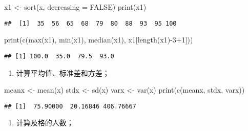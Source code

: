 \documentclass[
]{article}
\newenvironment{Shaded}{\begin{snugshade}}{\end{snugshade}}
\newcommand{\AttributeTok}[1]{\textcolor[rgb]{0.77,0.63,0.00}{#1}}
\newcommand{\ConstantTok}[1]{\textcolor[rgb]{0.00,0.00,0.00}{#1}}
\newcommand{\DecValTok}[1]{\textcolor[rgb]{0.00,0.00,0.81}{#1}}
\newcommand{\FunctionTok}[1]{\textcolor[rgb]{0.00,0.00,0.00}{#1}}
\newcommand{\NormalTok}[1]{#1}
\newcommand{\OtherTok}[1]{\textcolor[rgb]{0.56,0.35,0.01}{#1}}
\newcommand{\SpecialCharTok}[1]{\textcolor[rgb]{0.00,0.00,0.00}{#1}}
\providecommand{\tightlist}{%
  \setlength{\itemsep}{0pt}\setlength{\parskip}{0pt}}
\begin{document}
\begin{Shaded}
\begin{Highlighting}[]
\NormalTok{x1 }\OtherTok{\textless{}{-}} \FunctionTok{sort}\NormalTok{(x, }\AttributeTok{decreasing =} \ConstantTok{FALSE}\NormalTok{)}
\FunctionTok{print}\NormalTok{(x1)}
\end{Highlighting}
\end{Shaded}

\begin{verbatim}
##  [1]  35  56  65  68  79  80  88  93  95 100
\end{verbatim}

\begin{Shaded}
\begin{Highlighting}[]
\FunctionTok{print}\NormalTok{(}\FunctionTok{c}\NormalTok{(}\FunctionTok{max}\NormalTok{(x1), }\FunctionTok{min}\NormalTok{(x1), }\FunctionTok{median}\NormalTok{(x1), x1[}\FunctionTok{length}\NormalTok{(x1)}\SpecialCharTok{{-}}\DecValTok{3}\SpecialCharTok{+}\DecValTok{1}\NormalTok{]))}
\end{Highlighting}
\end{Shaded}

\begin{verbatim}
## [1] 100.0  35.0  79.5  93.0
\end{verbatim}

\begin{enumerate}
\def\labelenumi{\arabic{enumi}.}
\setcounter{enumi}{2}
\tightlist
\item
  计算平均值、标准差和方差；
\end{enumerate}

\begin{Shaded}
\begin{Highlighting}[]
\NormalTok{meanx }\OtherTok{\textless{}{-}} \FunctionTok{mean}\NormalTok{(x)}
\NormalTok{stdx }\OtherTok{\textless{}{-}} \FunctionTok{sd}\NormalTok{(x)}
\NormalTok{varx }\OtherTok{\textless{}{-}} \FunctionTok{var}\NormalTok{(x)}
\FunctionTok{print}\NormalTok{(}\FunctionTok{c}\NormalTok{(meanx, stdx, varx))}
\end{Highlighting}
\end{Shaded}

\begin{verbatim}
## [1]  75.90000  20.16846 406.76667
\end{verbatim}

\begin{enumerate}
\def\labelenumi{\arabic{enumi}.}
\setcounter{enumi}{3}
\tightlist
\item
  计算及格的人数；
\end{enumerate}
\end{document}
